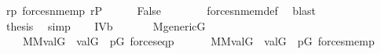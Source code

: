 \begin{isabellebody}
\ {\isacartoucheopen}r{\isasympreceq}p{\isacartoucheclose}\ {\isacartoucheopen}forces{\isacharunderscore}{\kern0pt}nmem{\isacharparenleft}{\kern0pt}p{\isacharcomma}{\kern0pt}{\isasymsigma}{\isacharcomma}{\kern0pt}{\isasymtau}{\isacharparenright}{\kern0pt}{\isacartoucheclose}\ {\isacartoucheopen}r{\isasymin}P{\isacartoucheclose}\isanewline
\ \ \ \ \isamarkupfalse%
\ {\isachardoublequoteopen}False{\isachardoublequoteclose}\isanewline
\ \ \ \ \ \ \isamarkupfalse%
\ forces{\isacharunderscore}{\kern0pt}nmem{\isacharunderscore}{\kern0pt}def\ \isamarkupfalse%
\ blast\isanewline
\ \ \ \ \isamarkupfalse%
\isanewline
\ \ \ \ \isamarkupfalse%
\ {\isacharquery}{\kern0pt}thesis\ \isamarkupfalse%
\ simp\isanewline
\ \ \isamarkupfalse%
\isanewline
{}\isamarkupfalse%
%
\endisatagproof
{\isafoldproof}%
%
\isadelimproof
\isanewline
%
\endisadelimproof
\isanewline
\isanewline
{}\isamarkupfalse%
\ IV{}{}{}b{\isacharcolon}{\kern0pt}\isanewline
\ \ \isanewline
\ \ \ \ {\isachardoublequoteopen}M{\isacharunderscore}{\kern0pt}generic{\isacharparenleft}{\kern0pt}G{\isacharparenright}{\kern0pt}{\isachardoublequoteclose}\isanewline
\ \ \ \isanewline
\ \ \ \ {\isachardoublequoteopen}{\isacharparenleft}{\kern0pt}{\isasymtau}{\isasymin}M{\isasymlongrightarrow}{\isasymtheta}{\isasymin}M{\isasymlongrightarrow}val{\isacharparenleft}{\kern0pt}G{\isacharcomma}{\kern0pt}{\isasymtau}{\isacharparenright}{\kern0pt}\ {\isacharequal}{\kern0pt}\ val{\isacharparenleft}{\kern0pt}G{\isacharcomma}{\kern0pt}{\isasymtheta}{\isacharparenright}{\kern0pt}\ {\isasymlongrightarrow}\ {\isacharparenleft}{\kern0pt}{\isasymexists}p{\isasymin}G{\isachardot}{\kern0pt}\ forces{\isacharunderscore}{\kern0pt}eq{\isacharparenleft}{\kern0pt}p{\isacharcomma}{\kern0pt}{\isasymtau}{\isacharcomma}{\kern0pt}{\isasymtheta}{\isacharparenright}{\kern0pt}{\isacharparenright}{\kern0pt}{\isacharparenright}{\kern0pt}\ {\isasymand}\isanewline
\ \ \ \ \ {\isacharparenleft}{\kern0pt}{\isasymtau}{\isasymin}M{\isasymlongrightarrow}{\isasymtheta}{\isasymin}M{\isasymlongrightarrow}val{\isacharparenleft}{\kern0pt}G{\isacharcomma}{\kern0pt}{\isasymtau}{\isacharparenright}{\kern0pt}\ {\isasymin}\ val{\isacharparenleft}{\kern0pt}G{\isacharcomma}{\kern0pt}{\isasymtheta}{\isacharparenright}{\kern0pt}\ {\isasymlongrightarrow}\ {\isacharparenleft}{\kern0pt}{\isasymexists}p{\isasymin}G{\isachardot}{\kern0pt}\ forces{\isacharunderscore}{\kern0pt}mem{\isacharparenleft}{\kern0pt}p{\isacharcomma}{\kern0pt}{\isasymtau}{\isacharcomma}{\kern0pt}{\isasymtheta}{\isacharparenright}{\kern0pt}{\isacharparenright}{\kern0pt}{\isacharparenright}{\kern0pt}{\isachardoublequoteclose}\ \isanewline

\end{isabellebody}
